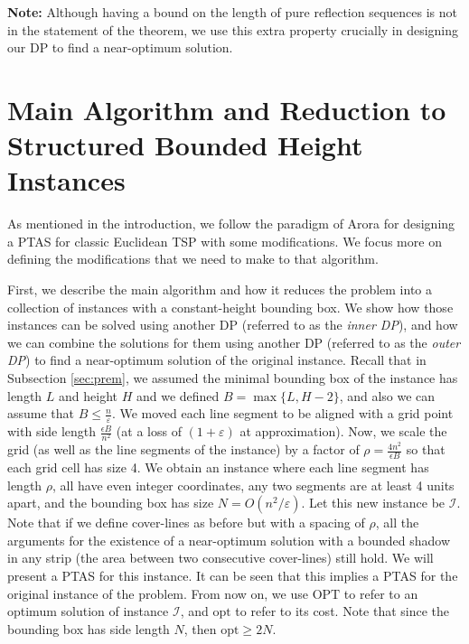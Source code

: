 \documentclass[pdflatex,sn-mathphys-num]{sn-jnl}
\theoremstyle{thmstyleone}
\newcommand{\eps}{\varepsilon}
\newcommand{\opt}{{\text{opt}}}
\newcommand{\OPT}{{\text{OPT}}}
\begin{document}
\vspace{.5cm}
\noindent \textbf{Note:} Although having a bound on the  length  of pure reflection sequences is not in the statement of the theorem, we use this extra property crucially in designing our DP to find a near-optimum solution.
        
\section{Main Algorithm and Reduction to Structured Bounded Height Instances}\label{sec:main-alg}
As mentioned in the introduction, we follow the paradigm of Arora \cite{Arora98} for designing a PTAS for classic Euclidean TSP with some modifications. We focus more on defining the modifications that we need to make to that algorithm. 

First, we describe the main algorithm and how it reduces the problem into a collection of 
instances with a constant-height bounding box. 
We show how those instances can be solved using another DP (referred to as the {\em inner DP}), and how we can combine the solutions for them using another DP (referred to as the {\em outer DP}) to find a near-optimum solution of the original instance.
Recall that in Subsection \ref{sec:prem}, we assumed the minimal bounding box of the instance has length $L$ and height $H$
and we defined $ B = \max \{L, H-2\} $, and also we can assume that $B\leq \frac{n}{\eps}$. We moved each line segment to be aligned with a grid point with side length $\frac{\epsilon B}{n^2}$ (at a loss of $(1+\eps)$ at approximation). Now, we scale the grid (as well as the line segments of the instance) by a factor of $\rho=\frac{4n^2}{\epsilon B}$ so that each grid cell has size 4. We obtain
an instance where each line segment has length $\rho$, all have even integer coordinates, any two segments are at least 4 units apart, and the bounding box has size $N=O(n^2/\eps)$. Let this new instance be $\mathcal I$. 
Note that if we define cover-lines as before but with a spacing of $\rho$,
all the arguments for the existence of a near-optimum solution with a bounded shadow in any strip (the area between two consecutive cover-lines) still hold. We will present a PTAS for this instance. It can be seen that this implies a PTAS for the original instance of the problem. From now on, we use $\OPT$ to refer to an optimum solution of instance
$\mathcal I$, and $\opt$ to refer to its cost. Note that since the bounding box has side length $N$, then $\opt\geq 2N$.
\end{document}
